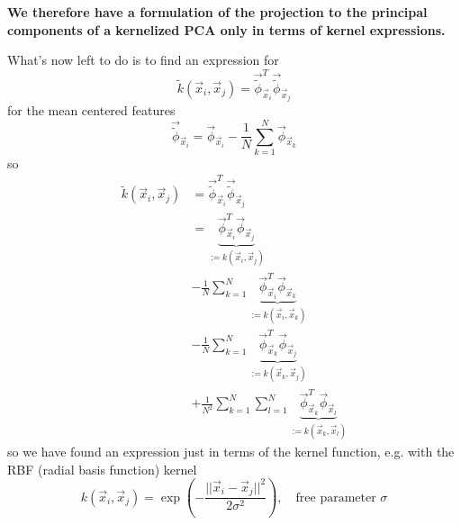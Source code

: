 
\textbf{We therefore have a formulation of the projection to the principal components of a kernelized PCA only in terms of kernel expressions.}

What's now left to do is to find an expression for
\begin{equation}
    \tilde{k}(\vec{x}_i,\vec{x}_j) = \vec{\tilde{\phi}}_{\vec{x}_i}^T \vec{\tilde{\phi}}_{\vec{x}_j}
\end{equation}
for the mean centered features
\begin{equation}
    \vec{\tilde{\phi}}_{\vec{x}_i} = \vec{\phi}_{\vec{x}_i} - \frac{1}{N} \sum_{k=1}^{N} \vec{\phi}_{\vec{x}_k}
\end{equation}
so
\begin{equation}
    \begin{aligned}
        \tilde{k}(\vec{x}_i,\vec{x}_j) &= \vec{\tilde{\phi}}_{\vec{x}_i}^T \vec{\tilde{\phi}}_{\vec{x}_j} \\
                                       &= \underbrace{\vec{\phi}_{\vec{x}_i}^T \vec{\phi}_{\vec{x}_j}}_{:=k(\vec{x}_i,\vec{x}_j)} \\
                                       &- \frac{1}{N} \sum_{k=1}^{N} \underbrace{\vec{\phi}_{\vec{x}_i}^T \vec{\phi}_{\vec{x}_k}}_{:=k(\vec{x}_i,\vec{x}_k)}\\
                                       &- \frac{1}{N} \sum_{k=1}^{N} \underbrace{\vec{\phi}_{\vec{x}_k}^T \vec{\phi}_{\vec{x}_j}}_{:=k(\vec{x}_k,\vec{x}_j)} \\
                                       &+ \frac{1}{N^2} \sum_{k=1}^{N} \sum_{l=1}^{N} \underbrace{\vec{\phi}_{\vec{x}_k}^T \vec{\phi}_{\vec{x}_l}}_{:=k(\vec{x}_k,\vec{x}_l)}
    \end{aligned}
\end{equation}
so we have found an expression just in terms of the kernel function, e.g. with
the RBF (radial basis function) kernel
\begin{equation}
    k(\vec{x}_i, \vec{x}_j) = \exp\left( - \frac{||\vec{x}_i - \vec{x}_j||^2}{2\sigma^2} \right), \quad \text{free parameter } \sigma
\end{equation}

